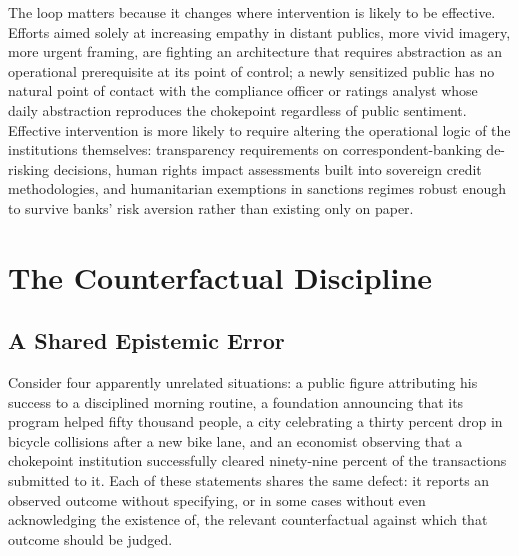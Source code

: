 \documentclass[11pt]{article}
\begin{document}
The loop matters because it changes where intervention is likely to be effective. Efforts aimed solely at increasing empathy in distant publics, more vivid imagery, more urgent framing, are fighting an architecture that requires abstraction as an operational prerequisite at its point of control; a newly sensitized public has no natural point of contact with the compliance officer or ratings analyst whose daily abstraction reproduces the chokepoint regardless of public sentiment. Effective intervention is more likely to require altering the operational logic of the institutions themselves: transparency requirements on correspondent-banking de-risking decisions, human rights impact assessments built into sovereign credit methodologies, and humanitarian exemptions in sanctions regimes robust enough to survive banks' risk aversion rather than existing only on paper.

\section{The Counterfactual Discipline}

\subsection{A Shared Epistemic Error}

Consider four apparently unrelated situations: a public figure attributing his success to a disciplined morning routine, a foundation announcing that its program helped fifty thousand people, a city celebrating a thirty percent drop in bicycle collisions after a new bike lane, and an economist observing that a chokepoint institution successfully cleared ninety-nine percent of the transactions submitted to it. Each of these statements shares the same defect: it reports an observed outcome without specifying, or in some cases without even acknowledging the existence of, the relevant counterfactual against which that outcome should be judged.
\end{document}
